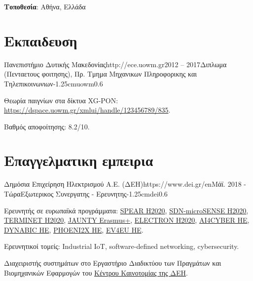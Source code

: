 \documentclass{mycv}
\begin{document}
	\thispagestyle{plain}
	\begin{center}
		\centering
		{\bf Τοποθεσία}: Αθήνα, Ελλάδα
	\end{center}
	\section{Εκπαιδευση}
	
	\begin{EntryDatedLogo}{Πανεπιστήμιο Δυτικής Μακεδονίας}{http://ece.uowm.gr}{2012 -- 2017}{Διπλωμα (Πενταετους φοιτησης), Πρ. Τμημα Μηχανικων Πληροφορικης και Τηλεπικοινωνιων}{-1.25cm}{uowm}{0.6}
		\begin{Itemize}
			\item Θεωρία παιγνίων στα δίκτυα XG-PON: \url{https://dspace.uowm.gr/xmlui/handle/123456789/835}.
			\item Βαθμός αποφοίτησης: 8.2/10.
		\end{Itemize}
	\end{EntryDatedLogo}
	
	\section{Επαγγελματικη εμπειρια}
	\begin{EntryDatedLogo}{Δημόσια Επιχείρηση Ηλεκτρισμού Α.Ε. (ΔΕΗ)}{https://www.dei.gr/en}{Μάϊ. 2018 - Τώρα}{Εξωτερικος Συνεργατης - Ερευνητης}{-1.25cm}{dei}{0.6}
	\begin{Itemize}
		\item Ερευνητής σε ευρωπαϊκά προγράμματα: \href{https://cordis.europa.eu/project/id/787011}{SPEAR H2020}, \href{https://cordis.europa.eu/project/id/833955}{SDN-microSENSE H2020}, \href{https://cordis.europa.eu/project/id/957406}{TERMINET H2020}, \href{https://www.jaunty.eu/}{JAUNTY Erasmus+}, \href{https://cordis.europa.eu/project/id/101021936}{ELECTRON H2020}, \href{https://cordis.europa.eu/project/id/101070450}{AI4CYBER HE}, \href{https://cordis.europa.eu/project/id/101070455}{DYNABIC HE}, \href{https://cordis.europa.eu/project/id/101070586}{PHOENI2X HE}, \href{https://cordis.europa.eu/project/id/101056765}{EV4EU HE}.
		\item Ερευνητικοί τομείς: Industrial IoT, software-defined networking, cybersecurity.
		\item Διαχειριστής συστημάτων στο Εργαστήριο Διαδικτύου των Πραγμάτων και Βιομηχανικών Εφαρμογών του \href{https://innovationhub.dei.gr/el/}{Κέντρου Καινοτομίας της ΔΕΗ}.

	\end{Itemize}
	\end{EntryDatedLogo}
\end{document}

